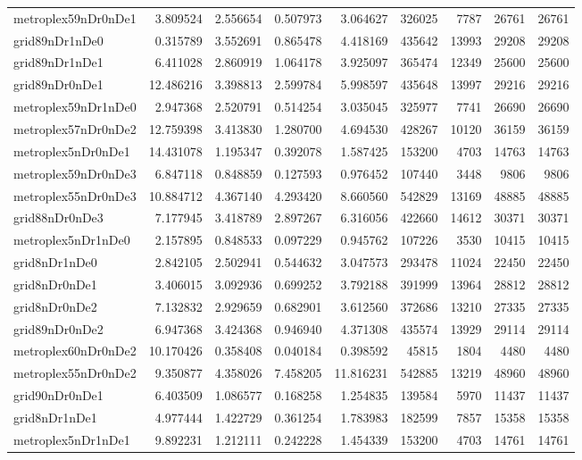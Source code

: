 \begin{longtable}{|l|r|r|r|r|r|r|r|r|}
metroplex59nDr0nDe1 & 3.809524 & 2.556654 & 0.507973 & 3.064627 & 326025 & 7787 & 26761 & 26761 \\
grid89nDr1nDe0 & 0.315789 & 3.552691 & 0.865478 & 4.418169 & 435642 & 13993 & 29208 & 29208 \\
grid89nDr1nDe1 & 6.411028 & 2.860919 & 1.064178 & 3.925097 & 365474 & 12349 & 25600 & 25600 \\
grid89nDr0nDe1 & 12.486216 & 3.398813 & 2.599784 & 5.998597 & 435648 & 13997 & 29216 & 29216 \\
metroplex59nDr1nDe0 & 2.947368 & 2.520791 & 0.514254 & 3.035045 & 325977 & 7741 & 26690 & 26690 \\
metroplex57nDr0nDe2 & 12.759398 & 3.413830 & 1.280700 & 4.694530 & 428267 & 10120 & 36159 & 36159 \\
metroplex5nDr0nDe1 & 14.431078 & 1.195347 & 0.392078 & 1.587425 & 153200 & 4703 & 14763 & 14763 \\
metroplex59nDr0nDe3 & 6.847118 & 0.848859 & 0.127593 & 0.976452 & 107440 & 3448 & 9806 & 9806 \\
metroplex55nDr0nDe3 & 10.884712 & 4.367140 & 4.293420 & 8.660560 & 542829 & 13169 & 48885 & 48885 \\
grid88nDr0nDe3 & 7.177945 & 3.418789 & 2.897267 & 6.316056 & 422660 & 14612 & 30371 & 30371 \\
metroplex5nDr1nDe0 & 2.157895 & 0.848533 & 0.097229 & 0.945762 & 107226 & 3530 & 10415 & 10415 \\
grid8nDr1nDe0 & 2.842105 & 2.502941 & 0.544632 & 3.047573 & 293478 & 11024 & 22450 & 22450 \\
grid8nDr0nDe1 & 3.406015 & 3.092936 & 0.699252 & 3.792188 & 391999 & 13964 & 28812 & 28812 \\
grid8nDr0nDe2 & 7.132832 & 2.929659 & 0.682901 & 3.612560 & 372686 & 13210 & 27335 & 27335 \\
grid89nDr0nDe2 & 6.947368 & 3.424368 & 0.946940 & 4.371308 & 435574 & 13929 & 29114 & 29114 \\
metroplex60nDr0nDe2 & 10.170426 & 0.358408 & 0.040184 & 0.398592 & 45815 & 1804 & 4480 & 4480 \\
metroplex55nDr0nDe2 & 9.350877 & 4.358026 & 7.458205 & 11.816231 & 542885 & 13219 & 48960 & 48960 \\
grid90nDr0nDe1 & 6.403509 & 1.086577 & 0.168258 & 1.254835 & 139584 & 5970 & 11437 & 11437 \\
grid8nDr1nDe1 & 4.977444 & 1.422729 & 0.361254 & 1.783983 & 182599 & 7857 & 15358 & 15358 \\
metroplex5nDr1nDe1 & 9.892231 & 1.212111 & 0.242228 & 1.454339 & 153200 & 4703 & 14761 & 14761 \\

\end{longtable}
